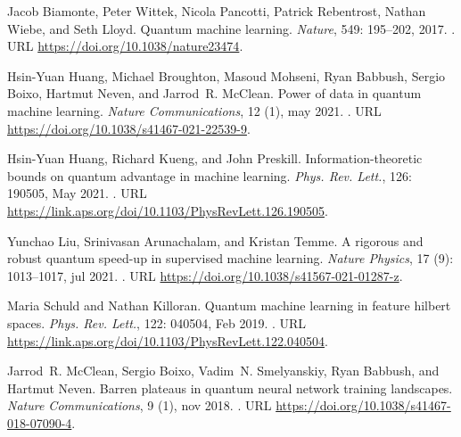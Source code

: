 \documentclass[letterpaper,preprintnumbers,preprint,aps,accepted=2022-05-26]{quantumarticle}
\begin{document}
\begin{thebibliography}{39}
Jacob Biamonte, Peter Wittek, Nicola Pancotti, Patrick Rebentrost, Nathan
  Wiebe, and Seth Lloyd.
\newblock Quantum machine learning.
\newblock \emph{Nature}, 549: 195--202, 2017.
\newblock {}.
\newblock URL \url{https://doi.org/10.1038/nature23474}.

Hsin-Yuan Huang, Michael Broughton, Masoud Mohseni, Ryan Babbush, Sergio Boixo,
  Hartmut Neven, and Jarrod~R. McClean.
\newblock Power of data in quantum machine learning.
\newblock \emph{Nature Communications}, 12 (1), may
  2021{}.
\newblock {}.
\newblock URL \url{https://doi.org/10.1038/s41467-021-22539-9}.

Hsin-Yuan Huang, Richard Kueng, and John Preskill.
\newblock Information-theoretic bounds on quantum advantage in machine
  learning.
\newblock \emph{Phys. Rev. Lett.}, 126: 190505, May
  2021{}.
\newblock {}.
\newblock URL \url{https://link.aps.org/doi/10.1103/PhysRevLett.126.190505}.

Yunchao Liu, Srinivasan Arunachalam, and Kristan Temme.
\newblock A rigorous and robust quantum speed-up in supervised machine
  learning.
\newblock \emph{Nature Physics}, 17 (9): 1013--1017, jul
  2021.
\newblock {}.
\newblock URL \url{https://doi.org/10.1038/s41567-021-01287-z}.

Maria Schuld and Nathan Killoran.
\newblock Quantum machine learning in feature hilbert spaces.
\newblock \emph{Phys. Rev. Lett.}, 122: 040504, Feb 2019.
\newblock {}.
\newblock URL \url{https://link.aps.org/doi/10.1103/PhysRevLett.122.040504}.

Jarrod~R. McClean, Sergio Boixo, Vadim~N. Smelyanskiy, Ryan Babbush, and
  Hartmut Neven.
\newblock Barren plateaus in quantum neural network training landscapes.
\newblock \emph{Nature Communications}, 9 (1), nov 2018.
\newblock {}.
\newblock URL \url{https://doi.org/10.1038/s41467-018-07090-4}.


\end{thebibliography}
\end{document}
